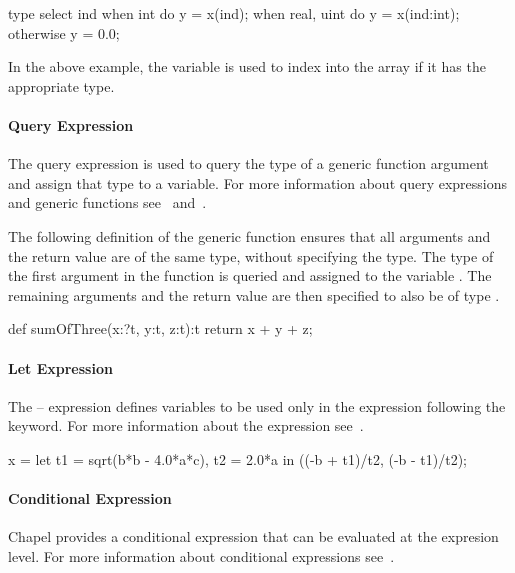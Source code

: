 \begin{example}
\begin{chapel}
type select ind {
  when int do y = x(ind);
  when real, uint do y = x(ind:int);
  otherwise y = 0.0;
}
\end{chapel}
In the above example, the variable  is used
to index into the array  if it has the appropriate
type.
\end{example}

\paragraph{Query Expression}
The query expression is used to query the type of a generic function argument
and assign that type to a variable.  For more information about
query expressions and generic functions see~ 
and~.

\begin{example}
The following definition of the generic function  
ensures that all arguments and the return value are of the same type, 
without specifying the type.
The type of the first argument in the 
function is queried and assigned to the variable .  The remaining
arguments and the return value are then specified to also be of type .
\begin{chapel}
def sumOfThree(x:?t, y:t, z:t):t {
   return x + y + z;
}
\end{chapel}
\end{example}

\paragraph{Let Expression} 
The -- expression defines variables to
be used only in the expression following the  keyword.
For more information about the  expression 
see~.

\begin{example}
\begin{chapel}
x = let t1 = sqrt(b*b - 4.0*a*c), t2 = 2.0*a
    in ((-b + t1)/t2, (-b - t1)/t2);
\end{chapel}
\end{example}

\paragraph{Conditional Expression} 
Chapel provides a conditional expression that can be evaluated
at the expresion level.  For more information about conditional
expressions see~.


